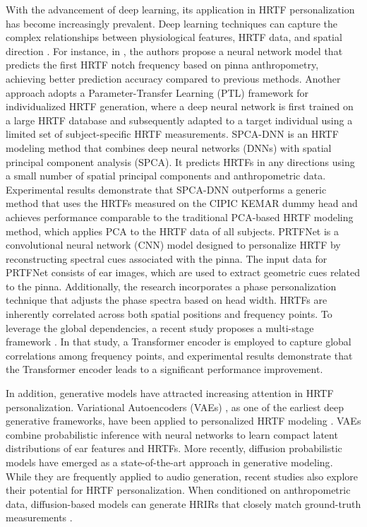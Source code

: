 \documentclass[a4paper,fleqn]{cas-dc}
\begin{document}
With the advancement of deep learning, its application in HRTF personalization has become increasingly prevalent. Deep learning techniques can capture the complex relationships between physiological features, HRTF data, and spatial direction \cite{fantini2025survey}. For instance, in \cite{arbel_hrtf_2024-1}, the authors propose a neural network model that predicts the first HRTF notch frequency based on pinna anthropometry, achieving better prediction accuracy compared to previous methods. Another approach adopts a Parameter-Transfer Learning (PTL) framework 
\cite{qi_parameter-transfer_2019-1} for individualized HRTF generation, where a deep neural network is first trained on a large HRTF database and subsequently adapted to a target individual using a limited set of subject-specific HRTF measurements. SPCA-DNN \cite{zhang_modeling_2020-1} is an HRTF modeling method that combines deep neural networks (DNNs) with spatial principal component analysis (SPCA). It predicts HRTFs in any directions using a small number of spatial principal components and anthropometric data. Experimental results demonstrate that SPCA-DNN outperforms a generic method that uses the HRTFs measured on the CIPIC KEMAR dummy head\cite{algazi2001cipic} and achieves performance comparable to the traditional PCA-based HRTF modeling method, which applies PCA to the HRTF data of all subjects. PRTFNet \cite{ko_prtfnet_2023} is a convolutional neural network (CNN) model designed to personalize HRTF by reconstructing spectral cues associated with the pinna. The input data for PRTFNet consists of ear images, which are used to extract geometric cues related to the pinna. Additionally, the research incorporates a phase personalization technique that adjusts the phase spectra based on head width.
HRTFs are inherently correlated across both spatial positions and frequency points. To leverage the global dependencies, a recent study proposes a multi-stage framework \cite{qiu_individual_2023}. In that study, a Transformer encoder is employed to capture global correlations among frequency points, and experimental results demonstrate that the Transformer encoder leads to a significant performance improvement.

In addition, generative models have attracted increasing attention in HRTF personalization. Variational Autoencoders (VAEs) \cite{kingma_auto-encoding_2022}, as one of the earliest deep generative frameworks, have been applied to personalized HRTF modeling \cite{miccini_hybrid_2021}. VAEs combine probabilistic inference with neural networks to learn compact latent distributions of ear features and HRTFs. More recently, diffusion probabilistic models have emerged as a state-of-the-art approach in generative modeling\cite{yang2023diffusion}. While they are frequently applied to audio generation, recent studies also explore their potential for HRTF personalization. When conditioned on anthropometric data, diffusion-based models can generate HRIRs that closely match ground-truth measurements \cite{10887566}.
\end{document}
